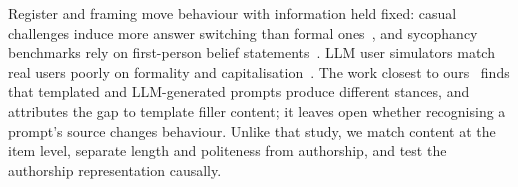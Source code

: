 Register and framing move behaviour with information held fixed: casual challenges induce more answer switching than formal ones~\citep{kim2025challenging}, and sycophancy benchmarks rely on first-person belief statements~\citep{sharma2023towards}.
LLM user simulators match real users poorly on formality and capitalisation~\citep{ivey2024real}.
The work closest to ours~\citep{chalkidis2026templated} finds that templated and LLM-generated prompts produce different stances, and attributes the gap to template filler content; it leaves open whether recognising a prompt's source changes behaviour.
Unlike that study, we match content at the item level, separate length and politeness from authorship, and test the authorship representation causally.
